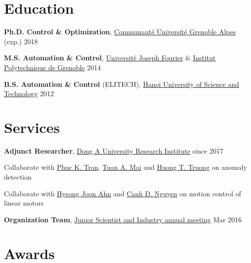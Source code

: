 \documentclass[a4paper,11pt]{article}
\begin{document}
  \section{Education}

  \textbf{Ph.D. Control \& Optimization},
  \href{https://www.communaute-univ-grenoble-alpes.fr/}{Communaut\'{e} Universit\'{e} Grenoble Alpes}
  \hfill {(exp.) 2018}

  \vspace{0.1cm}

  \textbf{M.S. Automation \& Control},
  \href{https://www.univ-grenoble-alpes.fr/}{Universit\'{e} Joseph Fourier} \& \href{http://www.grenoble-inp.fr/}{Institut Polytechnique de Grenoble}
  \hfill {2014}

  \vspace{0.1cm}

  \textbf{B.S. Automation \& Control} (ELITECH),
  \href{https://www.hust.edu.vn}{Hanoi University of Science and Technology}
  \hfill {2012}

  \section{Services}

  \textbf{Adjunct Researcher}, 
  \href{https://donga.edu.vn/english}{Dong A University Research Institute}
  \hfill {since 2017}
  \begin{innerlist}
  \item Collaborate with \href{https://scholar.google.fr/citations?user=uGv7zzQAAAAJ&hl=en}{Phuc K. Tran}, \href{https://www.researchgate.net/profile/Anh_Tuan_Mai}{Tuan A. Mai} and \href{https://scholar.google.com/citations?user=y7XjYaQAAAAJ&hl=en}{Huong T. Truong} on anomaly detection
  \item Collaborate with \href{https://www.researchgate.net/profile/Hyeong_Joon_Ahn}{Hyeong Joon Ahn} and \href{https://www.researchgate.net/profile/Nguyen_Duc_Canh}{Canh D. Nguyen} on motion control of linear motors
  \end{innerlist}

  \vspace{0.1cm}

  \textbf{Organization Team}, 
  \href{http://www.jsiam.giant-grenoble.org}{Junior Scientist and Industry annual meeting}
  \hfill {Mar 2016}

  \section{Awards}
\end{document}
